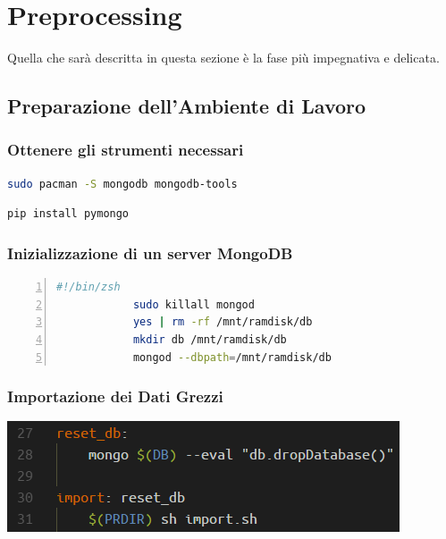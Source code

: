 \chapter{Preprocessing}

Quella che sarà descritta in questa sezione è la fase più impegnativa e delicata. 

\section{Preparazione dell'Ambiente di Lavoro}

	\subsection{Ottenere gli strumenti necessari}

		\begin{lstlisting}[language=bash,caption={installazione di MongoDB}]
			sudo pacman -S mongodb mongodb-tools
		\end{lstlisting}

		\begin{lstlisting}[language=bash,caption={installazione di pymongo}]
			pip install pymongo
		\end{lstlisting}

	\subsection{Inizializzazione di un server MongoDB}

		\begin{lstlisting}[language=bash,caption={script di lancio di un server MongoDB}, numbers=left, stepnumber=1]
			#!/bin/zsh
			sudo killall mongod
			yes | rm -rf /mnt/ramdisk/db
			mkdir db /mnt/ramdisk/db
			mongod --dbpath=/mnt/ramdisk/db
		\end{lstlisting}

	\subsection{Importazione dei Dati Grezzi}

	\begin{center}
		\includegraphics[scale=0.7]{img/import.png}
	\end{center}

